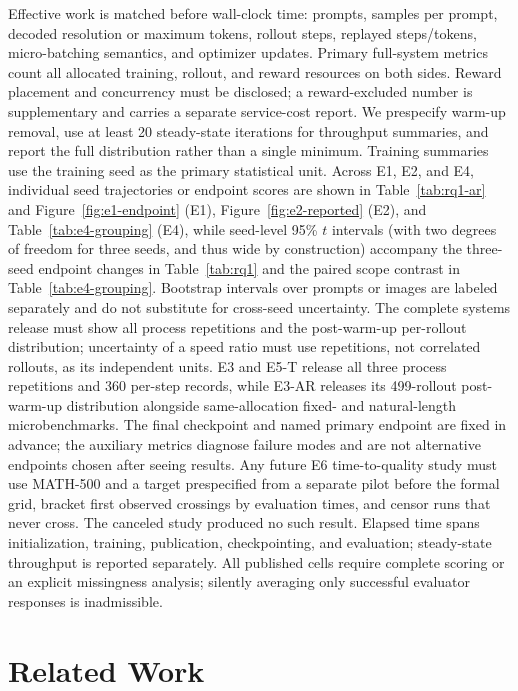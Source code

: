 \documentclass[10pt]{article}
\begin{document}
Effective work is matched before wall-clock time: prompts, samples per prompt, decoded resolution or maximum tokens, rollout steps, replayed steps/tokens, micro-batching semantics, and optimizer updates.
Primary full-system metrics count all allocated training, rollout, and reward resources on both sides. Reward placement and concurrency must be disclosed; a reward-excluded number is supplementary and carries a separate service-cost report.
We prespecify warm-up removal, use at least 20 steady-state iterations for throughput summaries, and report the full distribution rather than a single minimum.
Training summaries use the training seed as the primary statistical unit. Across E1, E2, and E4, individual seed trajectories or endpoint scores are shown in Table~\ref{tab:rq1-ar} and Figure~\ref{fig:e1-endpoint} (E1), Figure~\ref{fig:e2-reported} (E2), and Table~\ref{tab:e4-grouping} (E4), while seed-level 95\% $t$ intervals (with two degrees of freedom for three seeds, and thus wide by construction) accompany the three-seed endpoint changes in Table~\ref{tab:rq1} and the paired scope contrast in Table~\ref{tab:e4-grouping}. Bootstrap intervals over prompts or images are labeled separately and do not substitute for cross-seed uncertainty.
The complete systems release must show all process repetitions and the post-warm-up per-rollout distribution; uncertainty of a speed ratio must use repetitions, not correlated rollouts, as its independent units.
E3 and E5-T release all three process repetitions and 360 per-step records, while E3-AR releases its 499-rollout post-warm-up distribution alongside same-allocation fixed- and natural-length microbenchmarks.
The final checkpoint and named primary endpoint are fixed in advance; the auxiliary metrics diagnose failure modes and are not alternative endpoints chosen after seeing results.
Any future E6 time-to-quality study must use MATH-500 and a target prespecified from a separate pilot before the formal grid, bracket first observed crossings by evaluation times, and censor runs that never cross. The canceled study produced no such result.
Elapsed time spans initialization, training, publication, checkpointing, and evaluation; steady-state throughput is reported separately.
All published cells require complete scoring or an explicit missingness analysis; silently averaging only successful evaluator responses is inadmissible.

\section{Related Work}
\label{sec:related}
\end{document}
